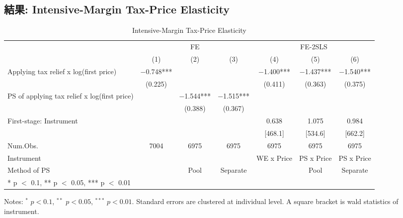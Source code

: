 \documentclass[
  11pt,
  a4paper,
]{article}
\begin{document}
\hypertarget{ux7d50ux679c-intensive-margin-tax-price-elasticity}{%
\subsection{結果: Intensive-Margin Tax-Price Elasticity}\label{ux7d50ux679c-intensive-margin-tax-price-elasticity}}

\begin{table}

\caption{\label{tab:MainIntensive}Intensive-Margin Tax-Price Elasticity}
\centering
\fontsize{7}{9}\selectfont
\begin{threeparttable}
\begin{tabular}[t]{lcccccc}
\toprule
\multicolumn{1}{c}{ } & \multicolumn{3}{c}{FE} & \multicolumn{3}{c}{FE-2SLS} \\
\cmidrule(l{3pt}r{3pt}){2-4} \cmidrule(l{3pt}r{3pt}){5-7}
  & (1) & (2) & (3) & (4) & (5) & (6)\\
\midrule
Applying tax relief x log(first price) & \num{-0.748}*** &  &  & \num{-1.400}*** & \num{-1.437}*** & \num{-1.540}***\\
 & (\num{0.225}) &  &  & (\num{0.411}) & (\num{0.363}) & (\num{0.375})\\
PS of applying tax relief x log(first price) &  & \num{-1.544}*** & \num{-1.515}*** &  &  & \\
 &  & (\num{0.388}) & (\num{0.367}) &  &  & \\
\midrule
First-stage: Instrument &  &  &  & 0.638 & 1.075 & 0.984\\
 &  &  &  & {}[468.1] & {}[534.6] & {}[662.2]\\
Num.Obs. & \num{7004} & \num{6975} & \num{6975} & \num{6975} & \num{6975} & \num{6975}\\
Instrument &  &  &  & WE x Price & PS x Price & PS x Price\\
Method of PS &  & Pool & Separate &  & Pool & Separate\\
\bottomrule
\multicolumn{7}{l}{\rule{0pt}{1em}* p $<$ 0.1, ** p $<$ 0.05, *** p $<$ 0.01}\\
\end{tabular}
\begin{tablenotes}
\item Notes: $^{*}$ $p < 0.1$, $^{**}$ $p < 0.05$, $^{***}$ $p < 0.01$. Standard errors are clustered at individual level. A square bracket is wald statistics of instrument.
\end{tablenotes}
\end{threeparttable}
\end{table}
\end{document}
